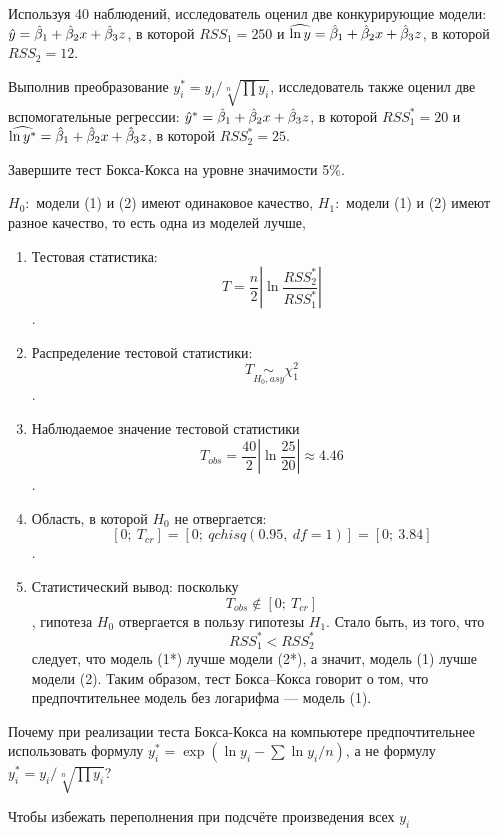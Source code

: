 \begin{problem}
Используя 40 наблюдений, исследователь оценил две конкурирующие модели: $\hat{y}=\hat{\beta}_1+\hat{\beta}_2 x +\hat{\beta}_3 z$, в которой $RSS_1=250$ и $\widehat{\ln y}=\hat{\beta}_1+\hat{\beta}_2 x +\hat{\beta}_3 z$, в которой $RSS_2=12$.

Выполнив преобразование $y^*_i=y_i/\sqrt[n]{\prod y_i}$, исследователь также оценил две вспомогательные регрессии: $\hat{y}^*=\hat{\beta}_1+\hat{\beta}_2 x +\hat{\beta}_3 z$, в которой $RSS^*_1=20$ и $\widehat{\ln y^*}=\hat{\beta}_1+\hat{\beta}_2 x +\hat{\beta}_3 z$, в которой $RSS^*_2=25$.

Завершите тест Бокса-Кокса на уровне значимости 5\%.


\begin{sol}
  $H_0:$ модели (1) и (2) имеют одинаковое качество,
  $H_1:$ модели (1) и (2) имеют разное качество, то есть одна из моделей лучше,
\begin{enumerate}
\item Тестовая статистика: \[T=\frac{n}{2}\left| \ln \frac{RSS_{2}^{*}}{RSS_{1}^{*}} \right|\].
\item Распределение тестовой статистики: \[T\underset{H_0, asy}{\sim} \chi^2_1 \].
\item Наблюдаемое значение тестовой статистики \[{{T}_{obs}}=\frac{40}{2}\left| \ln \frac{25}{20} \right|\approx \text{4.46}\].
\item Область, в которой $H_0$ не отвергается: \[[0;\ {{T}_{cr}}]=[0;\ qchisq(0.95,\ df=1)]=[0;\ \text{3.84}]\].
\item Статистический вывод: поскольку \[{{T}_{obs}}\notin [0;\ {{T}_{cr}}]\], гипотеза $H_0$ отвергается в пользу гипотезы $H_1$. Стало быть, из того, что \[RSS_{1}^{*}<RSS_{2}^{*}\] следует, что модель (1*) лучше модели (2*), а значит, модель (1) лучше модели (2). Таким образом, тест Бокса–Кокса говорит о том, что предпочтительнее модель без логарифма — модель (1).
\end{enumerate}

\end{sol}
\end{problem}


\begin{problem}
Почему при реализации теста Бокса-Кокса на компьютере предпочтительнее использовать формулу $y^*_i=\exp(\ln y_i - \sum \ln y_i /n) $, а не формулу $y^*_i=y_i/\sqrt[n]{\prod y_i}$?


\begin{sol}
Чтобы избежать переполнения при подсчёте произведения всех $y_i$
\end{sol}
\end{problem}



